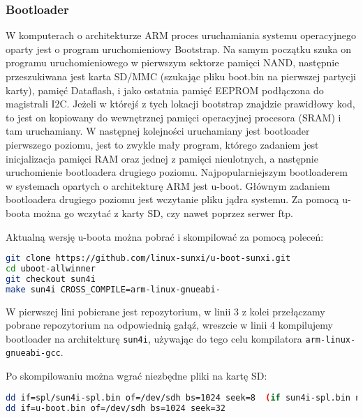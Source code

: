 \subsubsection{Bootloader}

W komputerach o architekturze ARM proces uruchamiania systemu operacyjnego oparty jest o program uruchomieniowy Bootstrap. Na samym początku szuka on programu uruchomieniowego w pierwszym sektorze pamięci NAND, następnie przeszukiwana jest karta SD/MMC (szukając pliku boot.bin na pierwszej partycji karty), pamięć Dataflash, i jako ostatnia pamięć EEPROM podłączona do magistrali I2C. Jeżeli w którejś z tych lokacji bootstrap znajdzie prawidłowy kod, to jest on kopiowany do wewnętrznej pamięci operacyjnej procesora (SRAM) i tam uruchamiany. W następnej kolejności uruchamiany jest bootloader pierwszego poziomu, jest to zwykle mały program, którego zadaniem jest inicjalizacja pamięci RAM oraz jednej z pamięci nieulotnych, a następnie uruchomienie bootloadera drugiego poziomu.
Najpopularniejszym bootloaderem w systemach opartych o architekturę ARM jest u-boot. Głównym zadaniem bootloadera drugiego poziomu jest wczytanie pliku jądra systemu. Za pomocą u-boota można go wczytać z karty SD, czy nawet poprzez serwer ftp.

\par

Aktualną wersję u-boota można pobrać i skompilować za pomocą poleceń:

\begin{lstlisting}[language=bash]
git clone https://github.com/linux-sunxi/u-boot-sunxi.git
cd uboot-allwinner
git checkout sun4i
make sun4i CROSS_COMPILE=arm-linux-gnueabi-
\end{lstlisting}

\par

W pierwszej lini pobierane jest repozytorium, w linii 3 z kolei przełączamy pobrane repozytorium na odpowiednią gałąź, wreszcie w linii 4 kompilujemy bootloader na architekturę \lstinline{sun4i}, używając do tego celu kompilatora \lstinline{arm-linux-gnueabi-gcc}.

Po skompilowaniu można wgrać niezbędne pliki na kartę SD:

\begin{lstlisting}[language=bash]
dd if=spl/sun4i-spl.bin of=/dev/sdh bs=1024 seek=8  (if sun4i-spl.bin not found, try sunxi-spl.bin)
dd if=u-boot.bin of=/dev/sdh bs=1024 seek=32
\end{lstlisting}

